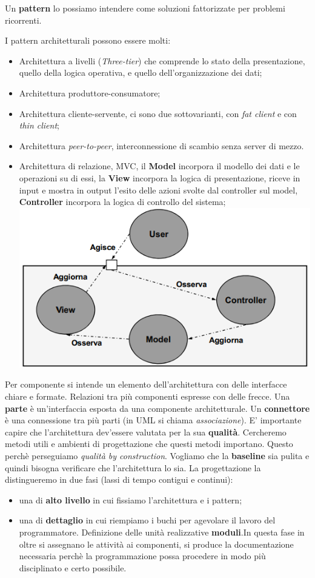 Un \textbf{pattern} lo possiamo intendere come soluzioni fattorizzate per problemi ricorrenti.

I  pattern architetturali possono essere molti:

\begin{itemize}
	\item Architettura a livelli (\textit{Three-tier}) che comprende lo stato della presentazione, quello della logica operativa, e quello dell'organizzazione dei dati;
	\item Architettura produttore-consumatore;
	\item Architettura cliente-servente, ci sono due sottovarianti, con \textit{fat client} e con \textit{thin client};
	\item Architettura \textit{peer-to-peer}, interconnessione di scambio senza server di mezzo.
	\item Architettura di relazione, MVC, il \textbf{Model} incorpora il modello dei dati e le operazioni su di essi, la \textbf{View} incorpora la logica di presentazione, riceve in input e mostra in output l'esito delle azioni svolte dal controller sul model, \textbf{Controller} incorpora la logica di controllo del sistema;\\
	\includegraphics[width=0.5\columnwidth]{img2}
\end{itemize}

Per componente si intende un elemento dell'architettura con delle interfacce chiare e formate. Relazioni tra più componenti espresse con delle frecce. Una \textbf{parte} è un'interfaccia esposta da una componente architetturale. Un \textbf{connettore} è una connessione tra più parti (in UML si chiama \textit{associazione}). E' importante capire che l'architettura dev'essere valutata per la sua \textbf{qualità}. Cercheremo metodi utili e ambienti di progettazione che questi metodi importano. Questo perchè perseguiamo \textit{qualità by construction}. Vogliamo che la \textbf{baseline} sia pulita e quindi bisogna verificare che l'architettura lo sia. La progettazione la distingueremo in due fasi (lassi di tempo contigui e continui):

\begin{itemize}

	\item una di \textbf{alto livello} in cui fissiamo l'architettura e i pattern;
	\item una di \textbf{dettaglio} in cui riempiamo i buchi per agevolare il lavoro del programmatore. Definizione delle unità realizzative \textbf{moduli}.In questa fase in oltre si assegnano le attività ai componenti, si produce la documentazione necessaria perchè la programmazione possa procedere in modo più disciplinato e certo possibile.

\end{itemize}


